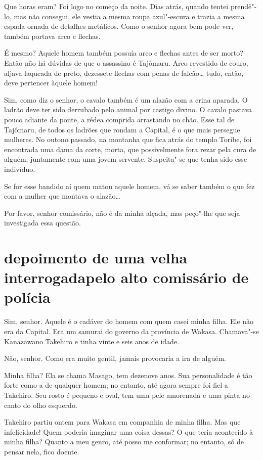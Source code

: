 Que horas eram? Foi logo no começo da noite. Dias atrás, quando tentei
prendê"-lo, mas não consegui, ele vestia a mesma roupa azul"-escura e
trazia a mesma espada ornada de detalhes metálicos. Como o senhor agora
bem pode ver, também portava arco e flechas.

É mesmo? Aquele homem também possuía arco e flechas antes de ser morto?
Então não há dúvidas de que o assassino é Tajômaru. Arco revestido de
couro, aljava laqueada de preto, dezessete flechas com penas de
falcão\ldots{} tudo, então, deve pertencer àquele homem!

Sim, como diz o senhor, o cavalo também é um alazão com a crina aparada.
O ladrão deve ter sido derrubado pelo animal por castigo divino. O
cavalo pastava pouco adiante da ponte, a rédea comprida arrastando no
chão. Esse tal de Tajômaru, de todos os ladrões que rondam a Capital, é
o que mais persegue mulheres. No outono passado, na montanha que fica
atrás do templo Toribe, foi encontrada uma dama da corte, morta, que
possivelmente fora rezar pela cura de alguém, juntamente com uma jovem
servente. Suspeita"-se que tenha sido esse indivíduo.

Se for esse bandido aí quem matou aquele homem, vá se saber também o que
fez com a mulher que montava o alazão…

Por favor, senhor comissário, não é da minha alçada, mas peço"-lhe que
seja investigada essa questão.

\section*{depoimento de uma velha interrogada\break pelo alto comissário de polícia}

Sim, senhor. Aquele é o cadáver do homem com quem casei minha filha. Ele
não era da Capital. Era um samurai do governo da província de Wakasa.
Chamava"-se Kanazawano Takehiro e tinha vinte e seis anos de idade.

Não, senhor. Como era muito gentil, jamais provocaria a ira de alguém.

Minha filha? Ela se chama Masago, tem dezenove anos. Sua personalidade é
tão forte como a de qualquer homem; no entanto, até agora sempre foi
fiel a Takehiro. Seu rosto é pequeno e oval, tem uma pele amorenada e
uma pinta no canto do olho esquerdo.

Takehiro partiu ontem para Wakasa em companhia de minha filha. Mas que
infelicidade! Quem poderia imaginar uma coisa dessas? O que teria
acontecido à minha filha? Quanto a meu genro, até posso me conformar;
no entanto, só de pensar nela, fico doente.


